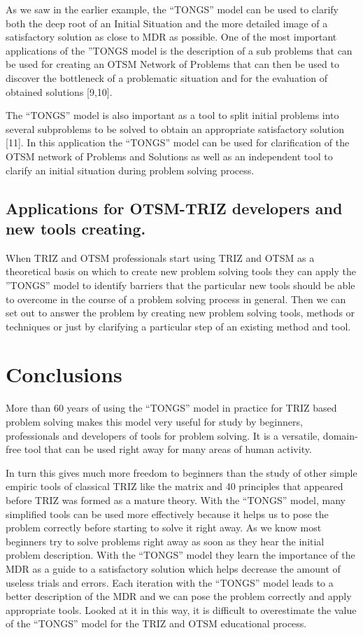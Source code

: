 \documentclass[11pt,a4paper]{article}
\begin{document}
As we saw in the earlier example, the “TONGS” model can be used to clarify
both the deep root of an Initial Situation and the more detailed image of a
satisfactory solution as close to MDR as possible.  One of the most important
applications of the ”TONGS model is the description of a sub problems that can
be used for creating an OTSM Network of Problems that can then be used to
discover the bottleneck of a problematic situation and for the evaluation of
obtained solutions [9,10].

The “TONGS” model is also important as a tool to split initial problems into
several subproblems to be solved to obtain an appropriate satisfactory
solution [11].  In this application the “TONGS” model can be used for
clarification of the OTSM network of Problems and Solutions as well as an
independent tool to clarify an initial situation during problem solving
process.

\subsection{Applications for OTSM-TRIZ developers and new tools creating.}

When TRIZ and OTSM professionals start using TRIZ and OTSM as a theoretical
basis on which to create new problem solving tools they can apply the ”TONGS”
model to identify barriers that the particular new tools should be able to
overcome in the course of a problem solving process in general.  Then we can
set out to answer the problem by creating new problem solving tools, methods
or techniques or just by clarifying a particular step of an existing method
and tool.

\section{Conclusions}

More than 60 years of using the “TONGS” model in practice for TRIZ based
problem solving makes this model very useful for study by beginners,
professionals and developers of tools for problem solving.  It is a versatile,
domain-free tool that can be used right away for many areas of human activity.

In turn this gives much more freedom to beginners than the study of other
simple empiric tools of classical TRIZ like the matrix and 40 principles that
appeared before TRIZ was formed as a mature theory. With the “TONGS” model,
many simplified tools can be used more effectively because it helps us to pose
the problem correctly before starting to solve it right away. As we know most
beginners try to solve problems right away as soon as they hear the initial
problem description. With the “TONGS” model they learn the importance of the
MDR as a guide to a satisfactory solution which helps decrease the amount of
useless trials and errors. Each iteration with the “TONGS” model leads to a
better description of the MDR and we can pose the problem correctly and apply
appropriate tools. Looked at it in this way, it is difficult to overestimate
the value of the “TONGS” model for the TRIZ and OTSM educational process.
\end{document}
